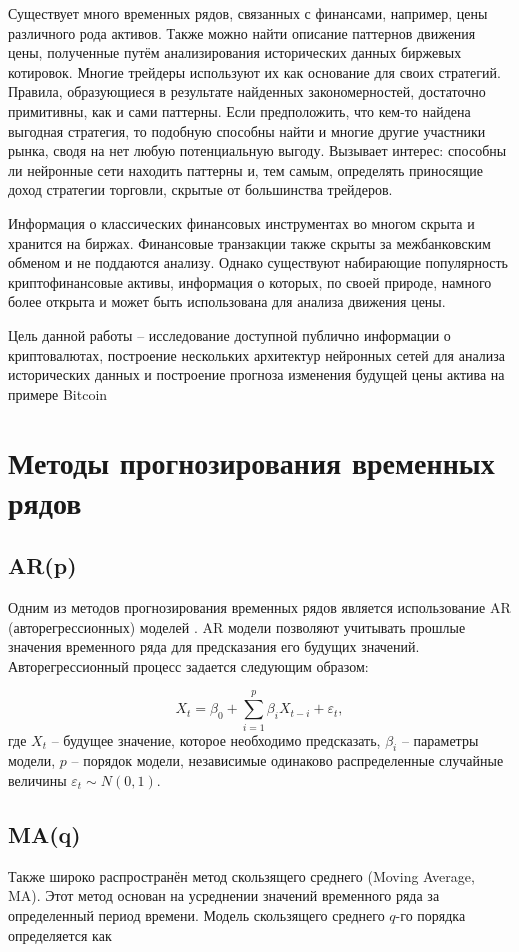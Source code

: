 \documentclass[diploma]{nanolab2015}
\begin{document}
Существует много временных рядов, связанных с финансами, например, цены различного
рода активов. Также можно найти описание паттернов движения цены, полученные путём анализирования исторических данных биржевых котировок. Многие трейдеры используют их как основание для своих стратегий. Правила, образующиеся в результате найденных закономерностей, достаточно примитивны, как и сами паттерны. Если предположить, что кем-то найдена выгодная стратегия, то подобную способны найти и многие другие участники рынка, сводя на нет любую потенциальную выгоду. Вызывает интерес: способны ли нейронные сети находить паттерны и, тем самым, определять приносящие доход стратегии торговли, скрытые от большинства трейдеров.

Информация о классических финансовых инструментах во многом скрыта и хранится на биржах. Финансовые транзакции также скрыты за межбанковским обменом и не поддаются анализу. Однако существуют набирающие популярность криптофинансовые активы, информация о которых, по своей природе, намного более открыта и может быть использована для анализа движения цены.

Цель данной работы -- исследование доступной публично информации о криптовалютах, построение нескольких архитектур нейронных сетей для анализа исторических данных и построение прогноза изменения будущей цены актива на примере Bitcoin

\newpage
\section{Методы прогнозирования временных рядов}
\subsection{AR(p)}
Одним из методов прогнозирования временных рядов является использование AR (авторегрессионных) моделей \cite{book1}. AR модели позволяют учитывать прошлые значения временного ряда для предсказания его будущих значений. Авторегрессионный процесс задается следующим образом:

$$
    X_t = \beta_0 + \sum_{i=1}^{p}\beta_i X_{t-i} + \varepsilon_t,
$$
где $X_t$ -- будущее значение, которое необходимо предсказать, $\beta_i$ -- параметры модели, $p$ -- порядок модели, независимые одинаково распределенные случайные величины $\varepsilon_t \sim N(0, 1)$.

\subsection{MA(q)}
Также широко распространён метод скользящего среднего (Moving Average, MA). Этот метод основан на усреднении значений временного ряда за определенный период времени. Модель скользящего среднего $q$-го порядка определяется как
\end{document}
